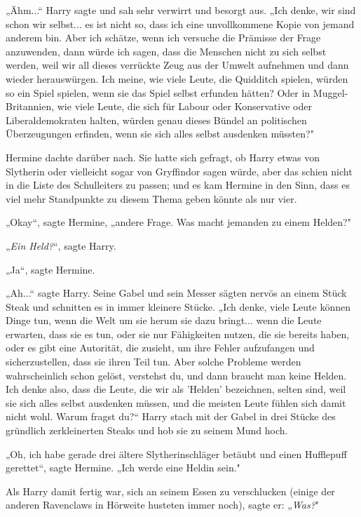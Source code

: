{„Ähm...“ Harry sagte und sah sehr verwirrt und besorgt aus. „Ich denke, wir sind schon wir selbst... es ist nicht so, dass ich eine unvollkommene Kopie von jemand anderem bin. Aber ich schätze, wenn ich versuche die Prämisse der Frage anzuwenden, dann würde ich sagen, dass die Menschen nicht zu sich selbst werden, weil wir all dieses verrückte Zeug aus der Umwelt aufnehmen und dann wieder herauswürgen. Ich meine, wie viele Leute, die Quidditch spielen, würden so ein Spiel spielen, wenn sie das Spiel selbst erfunden hätten? Oder in Muggel-Britannien, wie viele Leute, die sich für Labour oder Konservative oder Liberaldemokraten halten, würden genau dieses Bündel an politischen Überzeugungen erfinden, wenn sie sich alles selbst ausdenken müssten?"

Hermine dachte darüber nach. Sie hatte sich gefragt, ob Harry etwas von Slytherin oder vielleicht sogar von Gryffindor sagen würde, aber das schien nicht in die Liste des Schulleiters zu passen; und es kam Hermine in den Sinn, dass es viel mehr Standpunkte zu diesem Thema geben könnte als nur vier.

„Okay“, sagte Hermine, „andere Frage. Was macht jemanden zu einem Helden?"

„\emph{Ein Held?}“, sagte Harry.

„Ja“, sagte Hermine.

„Ah...“ sagte Harry. Seine Gabel und sein Messer sägten nervös an einem Stück Steak und schnitten es in immer kleinere Stücke. „Ich denke, viele Leute können Dinge tun, wenn die Welt um sie herum sie dazu bringt... wenn die Leute erwarten, dass sie es tun, oder sie nur Fähigkeiten nutzen, die sie bereits haben, oder es gibt eine Autorität, die zusieht, um ihre Fehler aufzufangen und sicherzustellen, dass sie ihren Teil tun. Aber solche Probleme werden wahrscheinlich schon gelöst, verstehst du, und dann braucht man keine Helden. Ich denke also, dass die Leute, die wir als 'Helden' bezeichnen, selten sind, weil sie sich alles selbst ausdenken müssen, und die meisten Leute fühlen sich damit nicht wohl. Warum fragst du?“ Harry stach mit der Gabel in drei Stücke des gründlich zerkleinerten Steaks und hob sie zu seinem Mund hoch.

„Oh, ich habe gerade drei ältere Slytherinschläger betäubt und einen Hufflepuff gerettet“, sagte Hermine. „Ich werde eine Heldin sein."

Als Harry damit fertig war, sich an seinem Essen zu verschlucken (einige der anderen Ravenclaws in Hörweite husteten immer noch), sagte er: „\emph{Was?}"

}
